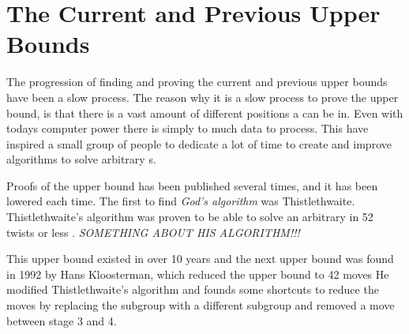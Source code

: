\section{The Current and Previous Upper Bounds}
The progression of finding and proving the current and previous upper bounds have been a slow process.
The reason why it is a slow process to prove the upper bound, is that there is a vast amount of different positions a \rubik{} can be in. Even with todays computer power there is simply to much data to process. This have inspired a small group of people to dedicate a lot of time to create and improve algorithms to solve arbitrary \rubik{}s.

\begin{comment}

The set solver created by Thomas Rockicki, which was described in the previous section will now be further described.


The set solver has a special way of testing the \rubik{}s. It does not solve them to the unit position $e$, instead it finds a move sequence for a subgroup of the \rubik{} this way it can solve approximately 19.5 billion cubes at a time and not just one. The reason for this is that if you relabel an arbitrary cube, that given cube can be unlabeled to approximately 19.5 billion different cube positions. Recall that there are approximately 19.5 billion positions in the set \m{H} and all these positions are equal to $e$ when relabeled. The same logic applies to any other given position.
\end{comment}

Proofs of the upper bound has been published several times, and it has been lowered each time.
The first to find \textit{God's algorithm} was Thistlethwaite. Thistlethwaite's algorithm was proven to be able to solve an arbitrary \rubik{} in 52 twists or less \cite{jaapthistle}.
\emph{SOMETHING ABOUT HIS ALGORITHM!!!}

This upper bound existed in over 10 years and the next upper bound was found in 1992 by Hans Kloosterman, which reduced the upper bound to 42 moves %
He modified Thistlethwaite's algorithm and founds some shortcuts to reduce the moves by replacing the  subgroup with a different subgroup and removed a move between stage 3 and 4.

